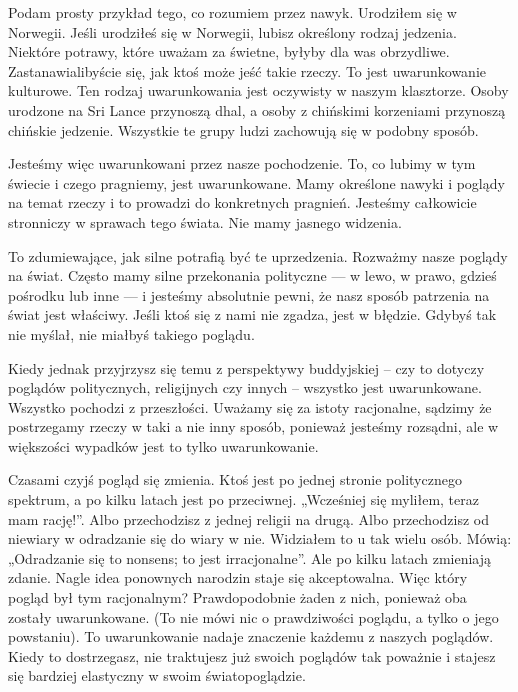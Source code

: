 \documentclass[12pt,openany]{book}
\begin{document}
Podam prosty przykład tego, co rozumiem przez nawyk. Urodziłem się w Norwegii. Jeśli urodziłeś się w Norwegii, lubisz określony rodzaj jedzenia. Niektóre potrawy, które uważam za świet\-ne, byłyby dla was obrzydliwe. Zastanawialibyście się, jak ktoś może jeść takie rzeczy. To jest uwarunkowanie kulturowe. Ten rodzaj uwarunkowania jest oczywisty w naszym klasztorze. Osoby urodzone na Sri Lance przynoszą dhal, a osoby z chińskimi korzeniami przynoszą chińskie jedzenie. Wszystkie te grupy ludzi zachowują się w podobny sposób.

Jesteśmy więc uwarunkowani przez nasze pochodzenie. To, co lubimy w tym świecie i czego pragniemy, jest uwarunkowane. Mamy określone nawyki i poglądy na temat rzeczy i to prowadzi do konkretnych pragnień. Jesteśmy całkowicie stronniczy w sprawach tego świata. Nie mamy jasnego widzenia.

To zdumiewające, jak silne potrafią być te uprzedzenia. Rozważmy nasze poglądy na świat. Często mamy silne przekonania polityczne --- w lewo, w prawo, gdzieś pośrodku lub inne --- i jesteśmy absolutnie pewni, że nasz sposób patrzenia na świat jest właściwy. Jeśli ktoś się z nami nie zgadza, jest w błędzie. Gdybyś tak nie myślał, nie miałbyś takiego poglądu.

Kiedy jednak przyjrzysz się temu z perspektywy buddyjskiej -- czy to dotyczy poglądów politycznych, religijnych czy innych -- wszystko jest uwarunkowane. Wszystko pochodzi z przeszłości. Uważamy się za istoty racjonalne, sądzimy że postrzegamy rzeczy w taki a nie inny sposób, ponieważ jesteśmy rozsądni, ale w większości wypadków jest to tylko uwarunkowanie.

Czasami czyjś pogląd się zmienia. Ktoś jest po jednej stronie politycznego spektrum, a po kilku latach jest po przeciwnej. \linebreak „Wcześniej się myliłem, teraz mam rację!”. Albo przechodzisz z jednej religii na drugą. Albo przechodzisz od niewiary w odradzanie się do wiary w nie. Widziałem to u tak wielu osób. Mówią: „Odradzanie się to nonsens; to jest irracjonalne”. Ale po kilku latach zmieniają zdanie. Nagle idea ponownych narodzin staje się akceptowalna. Więc który pogląd był tym racjonalnym? Prawdopodobnie żaden z nich, ponieważ oba zostały uwarunkowane. (To nie mówi nic o prawdziwości poglądu, a tylko o jego powstaniu). To uwarunkowanie nadaje znaczenie każdemu z naszych poglądów. Kiedy to dostrzegasz, nie traktujesz już swoich poglądów tak poważnie i stajesz się bardziej elastyczny w swoim światopoglądzie.
\end{document}
